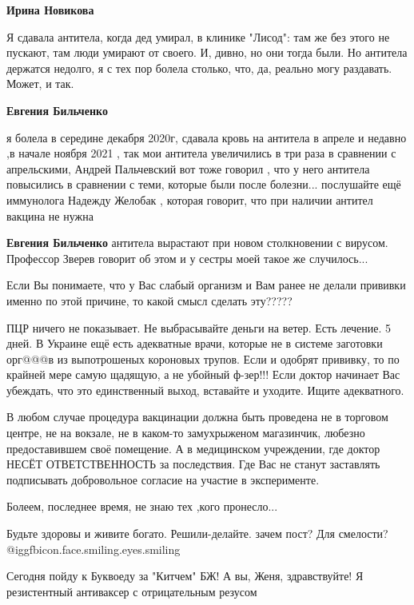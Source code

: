 \begin{itemize}
\begin{itemize} %
\textbf{Ирина Новикова} 

Я сдавала антитела, когда дед умирал, в клинике "Лисод": там же без этого не
пускают, там люди умирают от своего. И, дивно, но они тогда были. Но антитела
держатся недолго, я с тех пор болела столько, что, да, реально могу раздавать.
Может, и так.

\textbf{Евгения Бильченко} 

я болела в середине декабря 2020г, сдавала кровь на антитела в апреле и недавно
,в начале ноября 2021 , так мои антитела увеличились в три раза в сравнении с
апрельскими, Андрей Пальчевский вот тоже говорил , что у него антитела
повысились в сравнении с теми, которые были после болезни... послушайте ещё
иммунолога Надежду Желобак , которая говорит, что при наличии антител вакцина
не нужна

\textbf{Евгения Бильченко} антитела вырастают при новом столкновении с вирусом. Профессор Зверев говорит об этом и у сестры моей такое же случилось...
\end{itemize} %


Если Вы понимаете, что у Вас слабый организм и Вам ранее не делали прививки
именно по этой причине, то какой смысл сделать эту?????

ПЦР ничего не показывает. Не выбрасывайте деньги на ветер. Есть лечение. 5
дней. В Украине ещё есть адекватные врачи, которые не в системе заготовки
орг@@@в из выпотрошеных короновых трупов. Если и одобрят прививку, то по
крайней мере самую щадящую, а не убойный ф-зер!!! Если доктор начинает Вас
убеждать, что это единственный выход, вставайте и уходите. Ищите адекватного.

В любом случае процедура вакцинации должна быть проведена не в торговом центре,
не на вокзале, не в каком-то замухрыженом магазинчик, любезно предоставившем
своё помещение. А в медицинском учреждении, где доктор НЕСЁТ ОТВЕТСТВЕННОСТЬ за
последствия. Где Вас не станут заставлять подписывать добровольное согласие на
участие в эксперименте.

Болеем, последнее время, не знаю тех ,кого пронесло...

Будьте здоровы и живите богато.
Решили-делайте. зачем пост?
Для смелости? @igg{fbicon.face.smiling.eyes.smiling} 

Сегодня пойду к Буквоеду за "Китчем" БЖ!
А вы, Женя, здравствуйте!
Я резистентный антиваксер с отрицательным резусом


\end{itemize}
